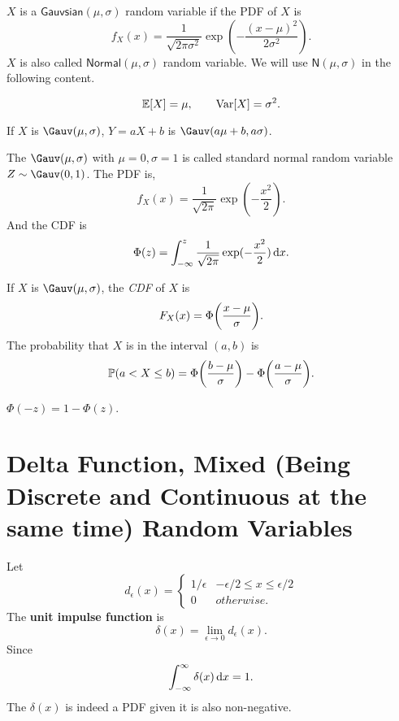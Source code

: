 \begin{definition}
    $X$ is a $\mathsf{Gauvsian}(\mu, \sigma)$ random variable if the \textnormal{PDF} of $X$ is
    \[f_X(x)=\frac{1}{\sqrt{2\pi\sigma^2}}\exp(-\frac{(x-\mu)^2}{2\sigma^2}).\]
    $X$ is also called $\mathsf{Normal}(\mu,\sigma)$ random variable. We will use $\mathsf{N}(\mu, \sigma)$ in the following content.
\end{definition}

\begin{theorem}
    \[\E{X} = \mu, \qquad \Var[X] = \sigma^2.\]
\end{theorem}

\begin{theorem}
    If $X$ is $\Gauv(\mu,\sigma)$, $Y=aX+b$ is $\Gauv(a\mu+b,a\sigma)$.
\end{theorem}

\begin{definition}
    The $\Gauv(\mu,\sigma)$ with $\mu=0, \sigma=1$ is called standard normal random variable $Z\sim\Gauv(0,1)$. The PDF is,
    \[f_X(x)=\frac{1}{\sqrt{2\pi}}\exp(-\frac{x^2}{2}).\]
    And the CDF is
    \[\Phi(z)=\int_{-\infty}^{z}\frac{1}{\sqrt{2\pi}}\exp(-\frac{x^2}{2})\mathop{}\!\mathrm{d} x.\]
\end{definition}

\begin{theorem}
    If $X$ is $\Gauv(\mu,\sigma)$, the \emph{CDF} of $X$ is
    \[F_X(x)=\Phi\parens*{\frac{x-\mu}{\sigma}}.\]
    The probability that $X$ is in the interval \emph{$(a,b)$} is
    \[\P{a<X\leq b}=\Phi\parens*{\frac{b-\mu}{\sigma}}-\Phi\parens*{\frac{a-\mu}{\sigma}}.\]
\end{theorem}

\begin{theorem}
    $\Phi(-z)=1-\Phi(z)$.
\end{theorem}

\iffalse
\section{Delta Function, Mixed (Being Discrete and Continuous at the same time) Random Variables
}
\begin{definition}
    Let
    \[d_{\epsilon}(x)={
        \begin{cases}
            1/\epsilon & -\epsilon/2\leq x\leq \epsilon/2 \\
            0 & otherwise.
        \end{cases}
    }\]
    The \textbf{unit impulse function} is
    \[\delta(x)=\lim_{\epsilon\rightarrow 0}d_{\epsilon}(x).\]
    Since
    \[\int_{-\infty}^{\infty}\delta(x)\mathop{}\!\mathrm{d} x = 1.\]
    The $\delta(x)$ is indeed a PDF given it is also non-negative.
\end{definition}

